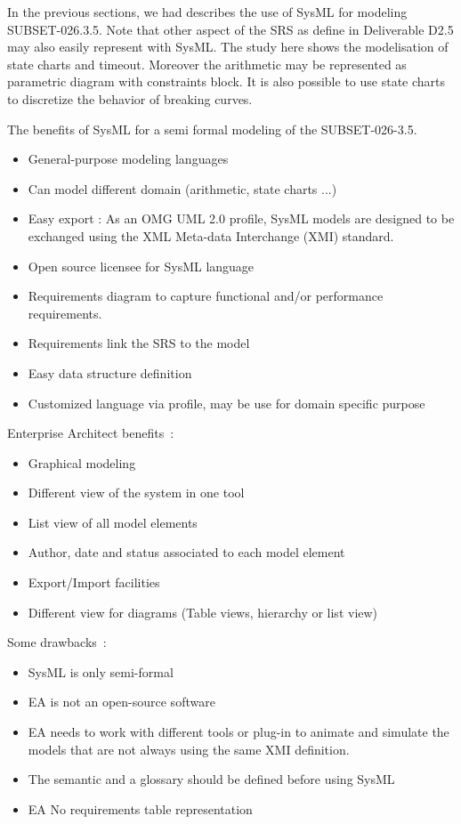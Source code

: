 \documentclass{openetcs_article}
\begin{document}
In the previous sections, we had describes the use of SysML for modeling
SUBSET-026.3.5. Note that other aspect of the SRS as define in Deliverable D2.5
may also easily represent with SysML. The study here shows the 
modelisation of state charts and timeout. Moreover the arithmetic may be
represented as parametric diagram with constraints block. It is also possible to
use state charts to discretize the behavior of breaking curves.



The benefits of SysML for a semi formal modeling of the SUBSET-026-3.5.
\begin{itemize}
\item General-purpose  modeling languages
\item Can model different domain (arithmetic, state charts ...)
\item Easy export : As an OMG UML 2.0 profile, SysML models are designed to be
exchanged using the XML Meta-data Interchange (XMI) standard.
\item Open source licensee for SysML language
\item Requirements diagram to capture functional and/or performance requirements.
\item Requirements link the SRS to the model
\item Easy data structure definition
\item Customized language via profile, may be use for domain specific purpose
\end{itemize}
Enterprise Architect benefits~:
\begin{itemize}
\item Graphical modeling
\item Different view of the system in one tool
\item List view of all model elements
\item Author, date and status associated to each model element
\item Export/Import facilities
\item Different view for diagrams (Table views,  hierarchy or list view)
\end{itemize}

Some drawbacks~:
\begin{itemize}
\item SysML is only semi-formal
\item EA is not an  open-source software
\item EA needs to work with different tools or plug-in to animate and simulate
the models that are not always using the same XMI definition.
\item The semantic and a glossary should be defined before using SysML
\item EA No requirements table representation
\end{itemize}
\end{document}

